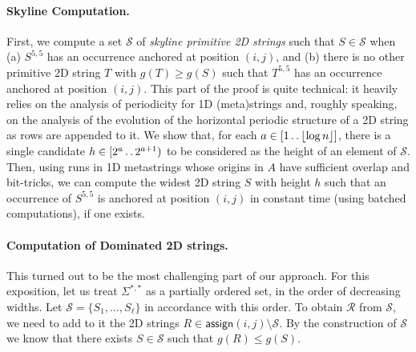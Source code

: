 \documentclass[11pt,letterpaper]{article}
\newcommand{\floor}[1]{\left\lfloor #1 \right\rfloor}
\def\dd{\mathinner{.\,.}}
\newcommand{\assign}{\textsf{assign}}
\renewcommand{\S}{\mathcal{S}}
\begin{document}
\paragraph*{Skyline Computation.}
First, we compute a set $\S$ of \emph{skyline primitive 2D strings} such that $S\in \mathcal{S}$ when
(a) $S^{5,5}$ has an occurrence anchored at position $(i,j)$, and (b) there is no other primitive 2D string $T$ with $g(T)\geq g(S)$ such that $T^{5,5}$ has an occurrence anchored at position $(i,j)$.
This part of the proof is quite technical:
it heavily relies on the analysis of periodicity for 1D (meta)strings and, roughly speaking, on the analysis of the evolution of the horizontal periodic structure of a 2D string as rows are appended to it.
We show that, for each $a \in [1 \dd \floor{\log n}]$, there is a single candidate $h \in [2^a \dd 2^{a+1})$ to be considered as the height of an element of $\mathcal{S}$.
Then, using runs in 1D metastrings whose origins in $A$ have sufficient overlap and bit-tricks, we can compute the widest 2D string $S$ with height $h$ such that an occurrence of $S^{5,5}$ is anchored at position $(i,j)$ in constant time (using batched computations), if one exists.

\paragraph*{Computation of Dominated 2D strings.}
This turned out to be the most challenging part of our approach.
For this exposition, let us treat $\Sigma^{*,*}$ as a partially ordered set, in the order of decreasing widths.
Let $\S=\{S_1, \ldots , S_\ell\}$ in accordance with this order.
To obtain $\mathcal{R}$ from $\S$, we need to add to it the 2D strings $R \in \assign(i,j) \setminus \S$. By the construction of $\S$ we know
that there exists $S\in \S$ such that $g(R) \leq g(S)$.
\end{document}
